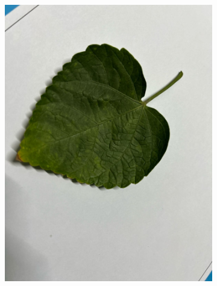 \documentclass[twocolumn]{article}
\begin{document}
\begin{figure}[H]
\begin{subfigure}[b]{0.30\columnwidth}
        \includegraphics[width=\textwidth]{rosa3}
    \end{subfigure}
    \vspace{0.5em}
    

\end{figure}
\end{document}
